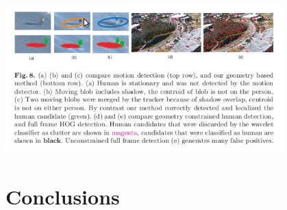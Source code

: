 \documentclass{beamer}
\begin{document}
\begin{frame}
	\includegraphics[width=0.8\textwidth]{img/fig8.jpg}
\end{frame}

\section{Conclusions}
\end{document}
